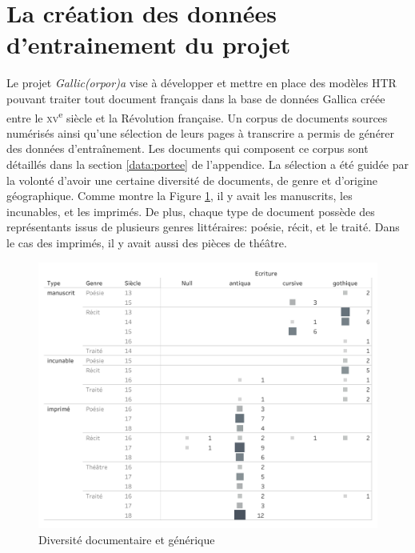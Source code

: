 \documentclass[class=article, crop=false]{standalone}
\begin{document}
\section{La création des données d'entrainement du projet}
\label{veritesDeTerrain}
Le projet \textit{Gallic(orpor)a} vise à développer et mettre en place des modèles \acrshort{HTR} pouvant traiter tout document français dans la base de données Gallica créée entre le \textsc{xv}\textsuperscript{e} siècle et la Révolution française. Un corpus de documents sources numérisés ainsi qu'une sélection de leurs pages à transcrire a permis de générer des données d'entraînement. Les documents qui composent ce corpus sont détaillés dans la section \ref{data:portee} de l'appendice. La sélection a été guidée par la volonté d'avoir une certaine diversité de documents, de genre et d'origine géographique. Comme montre la Figure \ref{fig:diversite_genre}, il y avait les manuscrits, les incunables, et les imprimés. De plus, chaque type de document possède des représentants issus de plusieurs genres littéraires: poésie, récit, et le traité. Dans le cas des imprimés, il y avait aussi des pièces de théâtre.

\begin{figure}[hbt!]
\includegraphics[width=\textwidth]{../../../images/diversite_genre.png}
\caption{Diversité documentaire et générique}
\label{fig:diversite_genre}
\end{figure} 
\end{document}
